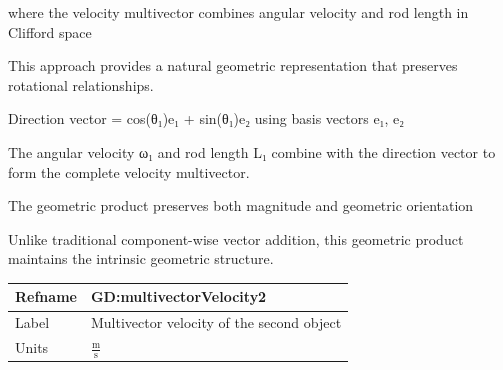 \documentclass[12pt]{article}
\begin{document}
{where the velocity multivector combines angular velocity and rod length in Clifford space

This approach provides a natural geometric representation that preserves rotational relationships.

Direction vector = cos(θ₁)e₁ + sin(θ₁)e₂ using basis vectors e₁, e₂

The angular velocity ω₁ and rod length L₁ combine with the direction vector to form the complete velocity multivector.

The geometric product preserves both magnitude and geometric orientation

Unlike traditional component-wise vector addition, this geometric product maintains the intrinsic geometric structure.

\medskip
\noindent
\begin{minipage}{\textwidth}
\begin{tabular}{>{\raggedright}p{}>{\raggedright\arraybackslash}p{}}
\toprule \textbf{Refname} & \textbf{GD:multivectorVelocity2}
\label{GD:multivectorVelocity2}
\\ \midrule
Label & Multivector velocity of the second object
        
\\ \midrule
Units & $\frac{\text{m}}{\text{s}}$
        

\end{tabular}
\end{minipage}}
\end{document}
